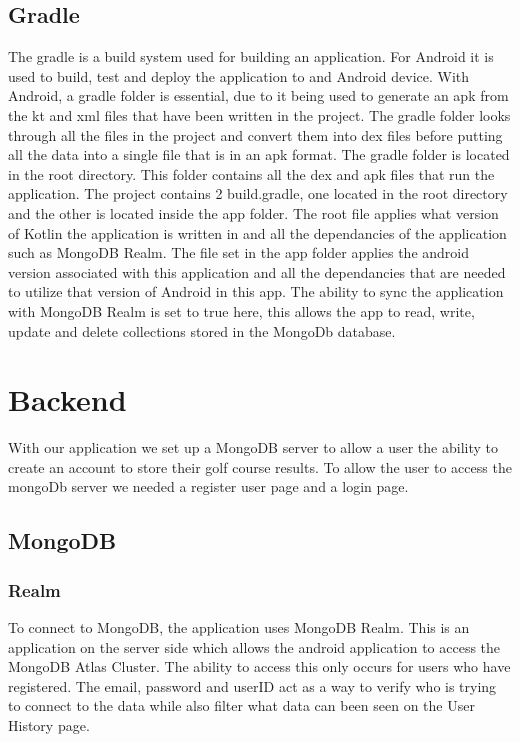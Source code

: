 \subsection{Gradle}
The gradle is a build system used for building an application. For Android it is used to build, test and deploy the application to and Android device.
\newline \newline
With Android, a gradle folder is essential, due to it being used to generate an apk from the kt and xml files that have been written in the project. The gradle folder looks through all the files in the project and convert them into dex files before putting all the data into a single file that is in an apk format. 
\newline \newline
The gradle folder is located in the root directory. This folder contains all the dex and apk files that run the application. The project contains 2 build.gradle, one located in the root directory and the other is located inside the app folder. The root file applies what version of Kotlin the application is written in and all the dependancies of the application such as MongoDB Realm. \newline \newline
The file set in the app folder applies the android version associated with this application and all the dependancies that are needed to utilize that version of Android in this app. The ability to sync the application with MongoDB Realm is set to true here, this allows the app to read, write, update and delete collections stored in the MongoDb database. 

\section{Backend}
With our application we set up a MongoDB server to allow a user the ability to create an account to store their golf course results. To allow the user to access the mongoDb server we needed a register user page and a login page.
\subsection{MongoDB}
\subsubsection{Realm}
To connect to MongoDB, the application uses MongoDB Realm. This is an application on the server side which allows the android application to access the MongoDB Atlas Cluster. The ability to access this only occurs for users who have registered. The email, password and userID act as a way to verify who is trying to connect to the data while also filter what data can been seen on the User History page.
